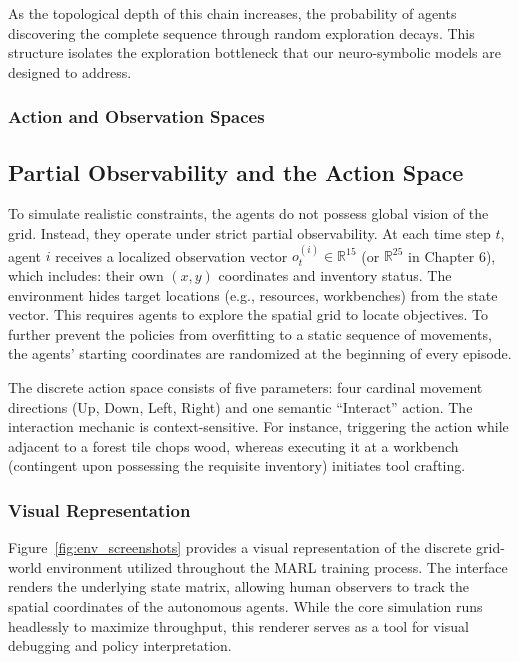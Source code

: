 As the topological depth of this chain increases, the probability of agents discovering the complete sequence through random exploration decays. This structure isolates the exploration bottleneck that our neuro-symbolic models are designed to address.

\subsubsection{Action and Observation Spaces}
\label{subsec:env_spaces}

\subsection{Partial Observability and the Action Space}
To simulate realistic constraints, the agents do not possess global vision of the grid. Instead, they operate under strict partial observability. At each time step $t$, agent $i$ receives a localized observation vector $o_t^{(i)} \in \mathbb{R}^{15}$ (or $\mathbb{R}^{25}$ in Chapter 6), which includes: their own $(x,y)$ coordinates and inventory status. The environment hides target locations (e.g., resources, workbenches) from the state vector. This requires agents to explore the spatial grid to locate objectives. To further prevent the policies from overfitting to a static sequence of movements, the agents' starting coordinates are randomized at the beginning of every episode.

The discrete action space consists of five parameters: four cardinal movement directions (Up, Down, Left, Right) and one semantic ``Interact'' action. The interaction mechanic is context-sensitive. For instance, triggering the action while adjacent to a forest tile chops wood, whereas executing it at a workbench (contingent upon possessing the requisite inventory) initiates tool crafting.

\subsubsection{Visual Representation}
\label{subsec:env_visual}

Figure~\ref{fig:env_screenshots} provides a visual representation of the discrete grid-world environment utilized throughout the MARL training process. The interface renders the underlying state matrix, allowing human observers to track the spatial coordinates of the autonomous agents. While the core simulation runs headlessly to maximize throughput, this renderer serves as a tool for visual debugging and policy interpretation. 

